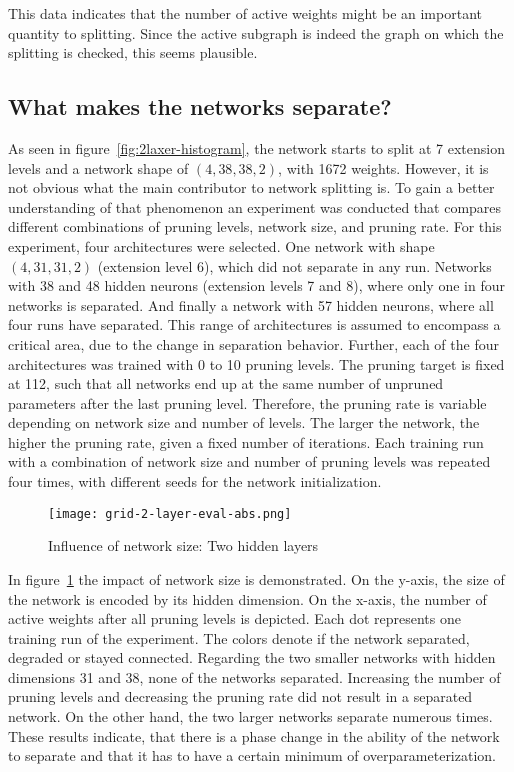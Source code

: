 This data indicates that the number of active weights might be an important quantity to splitting.
Since the active subgraph is indeed the graph on which the splitting is checked, this seems plausible.
 
\subsection{What makes the networks separate?}
As seen in figure~\ref{fig:2laxer-histogram}, the network starts to split at 7 extension levels and a network shape of $(4,38,38,2)$, with 1672 weights.
However, it is not obvious what the main contributor to network splitting is.
To gain a better understanding of that phenomenon an experiment was conducted that compares different combinations of pruning levels, network size, and pruning rate.
For this experiment, four architectures were selected.
One network with shape $(4,31,31,2)$ (extension level 6), which did not separate in any run.
Networks with 38 and 48 hidden neurons (extension levels 7 and 8), where only one in four networks is separated.
And finally a network with 57 hidden neurons, where all four runs have separated.
This range of architectures is assumed to encompass a critical area, due to the change in separation behavior.
Further, each of the four architectures was trained with 0 to 10 pruning levels.
The pruning target is fixed at 112, such that all networks end up at the same number of unpruned parameters after the last pruning level.
Therefore, the pruning rate is variable depending on network size and number of levels.
The larger the network, the higher the pruning rate, given a fixed number of iterations.
Each training run with a combination of network size and number of pruning levels was repeated four times, with different seeds for the network initialization.

\begin{figure}[ht]
    \centering
    \texttt{[image: grid-2-layer-eval-abs.png]}
    \caption{Influence of network size: Two hidden layers}\label{fig:grid-1}
\end{figure}

In figure~\ref{fig:grid-1} the impact of network size is demonstrated.
On the y-axis, the size of the network is encoded by its hidden dimension.
On the x-axis, the number of active weights after all pruning levels is depicted.
Each dot represents one training run of the experiment.
The colors denote if the network separated, degraded or stayed connected.
Regarding the two smaller networks with hidden dimensions 31 and 38, none of the networks separated. 
Increasing the number of pruning levels and decreasing the pruning rate did not result in a separated network.
On the other hand, the two larger networks separate numerous times.
These results indicate, that there is a phase change in the ability of the network to separate and that it has to have a certain minimum of overparameterization.

